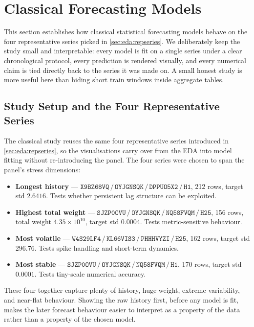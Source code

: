 \section{Classical Forecasting Models}
\label{sec:classical}

This section establishes how classical statistical forecasting models behave on the four representative series picked in \cref{sec:eda:repseries}. We deliberately keep the study small and interpretable: every model is fit on a single series under a clear chronological protocol, every prediction is rendered visually, and every numerical claim is tied directly back to the series it was made on. A small honest study is more useful here than hiding short train windows inside aggregate tables.

\subsection{Study Setup and the Four Representative Series}
\label{sec:classical:setup}

The classical study reuses the same four representative series introduced in \cref{sec:eda:repseries}, so the visualisations carry over from the EDA into model fitting without re-introducing the panel. The four series were chosen to span the panel's stress dimensions:

\begin{itemize}
  \item \textbf{Longest history} --- $\mathtt{X9BZ68VQ\,/\,OYJGNSQK\,/\,DPPUO5X2\,/\,H1}$, 212 rows, target std $2.6416$. Tests whether persistent lag structure can be exploited.
  \item \textbf{Highest total weight} --- $\mathtt{SJZP0OVU\,/\,OYJGNSQK\,/\,NQ58FVQM\,/\,H25}$, 156 rows, total weight $4.35\!\times\!10^{10}$, target std $0.0004$. Tests metric-sensitive behaviour.
  \item \textbf{Most volatile} --- $\mathtt{W4S29LF4\,/\,KL66VIS3\,/\,PHHHVYZI\,/\,H25}$, 162 rows, target std $296.76$. Tests spike handling and short-term dynamics.
  \item \textbf{Most stable} --- $\mathtt{SJZP0OVU\,/\,OYJGNSQK\,/\,NQ58FVQM\,/\,H1}$, 170 rows, target std $0.0001$. Tests tiny-scale numerical accuracy.
\end{itemize}

These four together capture plenty of history, huge weight, extreme variability, and near-flat behaviour. Showing the raw history first, before any model is fit, makes the later forecast behaviour easier to interpret as a property of the data rather than a property of the chosen model.

